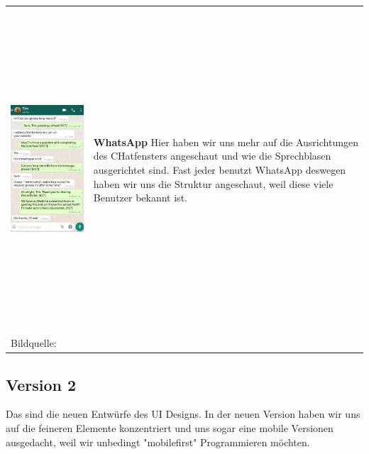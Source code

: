 \begin{tabular}{C{6cm}  L{7cm}}
    \includegraphics[width=\linewidth, height=12cm]{bilder/research pic/Tim Whatsapp.png} & \textbf{WhatsApp} \newline
    Hier haben wir uns mehr auf die Ausrichtungen des CHatfensters angeschaut und wie die Sprechblasen
    ausgerichtet sind. Fast jeder benutzt WhatsApp deswegen haben wir uns die Struktur angeschaut,
    weil diese viele Benutzer bekannt ist.                                                                              \\
    Bildquelle:\cite{timwhatsApp} \newline
\end{tabular}

\newpage


\subsection{Version 2}

Das sind die neuen Entwürfe des UI Designs. In der neuen Version haben wir uns auf die
feineren Elemente konzentriert und uns sogar eine mobile Versionen ausgedacht, weil wir
unbedingt "mobilefirst" Programmieren möchten.
\\

